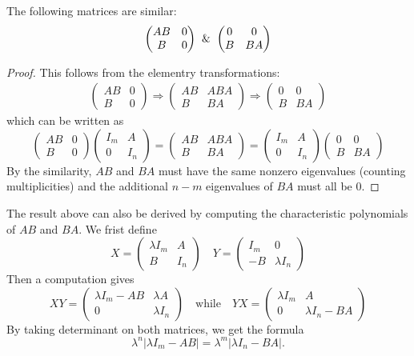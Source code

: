 \begin{proposition}
The following matrices are similar:
\[\begin{pmatrix}
AB&0\\
B&0
\end{pmatrix}\And\begin{pmatrix}
0&0\\
B&BA
\end{pmatrix}\]
\begin{proof}
This follows from the elementry transformations:
\begin{align*}
\begin{pmatrix}
AB&0\\
B&0
\end{pmatrix}\Longrightarrow\begin{pmatrix}
AB&ABA\\
B&BA
\end{pmatrix}\Longrightarrow\begin{pmatrix}
0&0\\
B&BA
\end{pmatrix}
\end{align*}
which can be written as
\[\begin{pmatrix}
AB&0\\
B&0
\end{pmatrix}\begin{pmatrix}
I_m&A\\
0&I_n
\end{pmatrix}=\begin{pmatrix}
AB&ABA\\
B&BA
\end{pmatrix}=\begin{pmatrix}
I_m&A\\
0&I_n
\end{pmatrix}\begin{pmatrix}
0&0\\
B&BA
\end{pmatrix}\]
By the similarity, $AB$ and $BA$ must have the same nonzero eigenvalues (counting multiplicities) and the additional $n-m$ eigenvalues of $BA$ must all be $0$.
\end{proof}
\end{proposition}
\begin{remark}
The result above can also be derived by computing the characteristic polynomials of $AB$ and $BA$. We frist define
\[X=\begin{pmatrix}
\lambda I_m&A\\
B&I_n
\end{pmatrix}\quad Y=\begin{pmatrix}
I_m&0\\
-B&\lambda I_n
\end{pmatrix}\]
Then a computation gives
\[XY=\begin{pmatrix}
\lambda I_m-AB&\lambda A\\
0&\lambda I_n
\end{pmatrix}\quad\text{while}\quad YX=\begin{pmatrix}
\lambda I_m&A\\
0&\lambda I_n-BA
\end{pmatrix}\]
By taking determinant on both matrices, we get the formula
\[\lambda^n|\lambda I_m-AB|=\lambda^m|\lambda I_n-BA|.\]
\end{remark}
